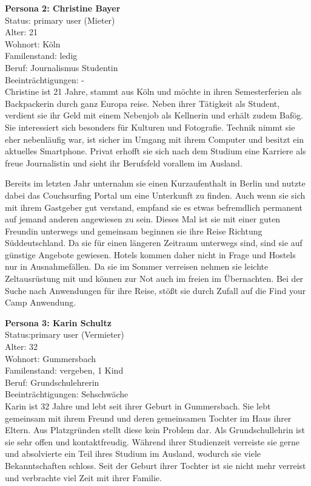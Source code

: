 \newpage
\textbf{Persona 2: Christine Bayer }\\
Status: primary user (Mieter)\\

Alter: 21\\
Wohnort: Köln\\
Familenstand: ledig\\
Beruf: Journalismus Studentin\\
Beeinträchtigungen: - \\

Christine ist 21 Jahre, stammt aus Köln und möchte in ihren Semesterferien als Backpackerin durch ganz Europa reise.
Neben ihrer Tätigkeit als Student, verdient sie ihr Geld mit einem Nebenjob als Kellnerin und erhält zudem Bafög.
Sie interessiert sich besonders für Kulturen und Fotografie. Technik nimmt sie eher nebenläufig war, ist sicher im Umgang mit ihrem Computer und besitzt ein aktuelles Smartphone.
Privat erhofft sie sich nach dem Studium eine Karriere als freue Journalistin und sieht ihr Berufsfeld vorallem im Ausland.

Bereits im letzten Jahr unternahm sie einen Kurzaufenthalt in Berlin und nutzte dabei das Couchsurfing Portal um eine Unterkunft zu finden. Auch wenn sie sich mit ihrem Gastgeber gut verstand, empfand sie es etwas befremdlich permanent auf jemand anderen angewiesen zu sein. Dieses Mal ist sie mit einer guten Freundin unterwegs und gemeinsam beginnen sie ihre Reise Richtung Süddeutschland. Da sie für einen längeren Zeitraum unterwegs sind, sind sie auf günstige Angebote gewiesen. Hotels kommen daher nicht in Frage und Hostels nur in Ausnahmefällen. Da sie im Sommer verreisen nehmen sie leichte Zeltausrüstung mit und können zur Not auch im freien im Übernachten. Bei der Suche nach Anwendungen für ihre Reise, stößt sie durch Zufall auf die Find your Camp Anwendung.



\newpage
\textbf{Persona 3: Karin Schultz}\\
Status:primary user (Vermieter)\\

Alter: 32\\
Wohnort: Gummersbach\\
Familenstand: vergeben, 1 Kind\\
Beruf: Grundschulehrerin\\
Beeinträchtigungen: Sehschwäche\\

Karin ist 32 Jahre und lebt seit ihrer Geburt in Gummersbach. Sie lebt gemeinsam mit ihrem Freund und deren gemeinsamen Tochter im Haus ihrer Eltern. Aus Platzgründen stellt diese kein Problem dar.
Als Grundschullehrin ist sie sehr offen und kontaktfreudig. Während ihrer Studienzeit verreiste sie gerne und absolvierte ein Teil ihres Studium im Ausland, wodurch sie viele Bekanntschaften schloss.
Seit der Geburt ihrer Tochter ist sie nicht mehr verreist und verbrachte viel Zeit mit ihrer Familie. \\

